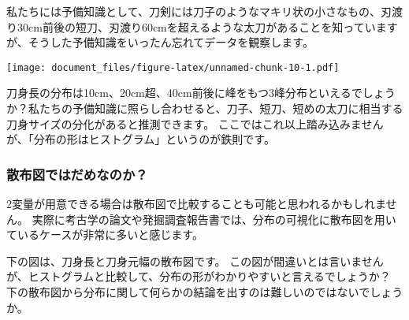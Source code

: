 \documentclass[]{article}
\newenvironment{Shaded}{\begin{snugshade}}{\end{snugshade}}
\newcommand{\DataTypeTok}[1]{\textcolor[rgb]{0.13,0.29,0.53}{#1}}
\newcommand{\KeywordTok}[1]{\textcolor[rgb]{0.13,0.29,0.53}{\textbf{#1}}}
\newcommand{\NormalTok}[1]{#1}
\newcommand{\OperatorTok}[1]{\textcolor[rgb]{0.81,0.36,0.00}{\textbf{#1}}}
\newcommand{\StringTok}[1]{\textcolor[rgb]{0.31,0.60,0.02}{#1}}
\begin{document}
私たちには予備知識として、刀剣には刀子のようなマキリ状の小さなもの、刃渡り30cm前後の短刀、刃渡り60cmを超えるような太刀があることを知っていますが、そうした予備知識をいったん忘れてデータを観察します。

\begin{Shaded}
\end{Shaded}

\texttt{[image: document\_files/figure-latex/unnamed-chunk-10-1.pdf]}

刀身長の分布は10cm、20cm超、40cm前後に峰をもつ3峰分布といえるでしょうか？私たちの予備知識に照らし合わせると、刀子、短刀、短めの太刀に相当する刀身サイズの分化があると推測できます。
ここではこれ以上踏み込みませんが、「分布の形はヒストグラム」というのが鉄則です。

\subsubsection{散布図ではだめなのか？}

2変量が用意できる場合は散布図で比較することも可能と思われるかもしれません。
実際に考古学の論文や発掘調査報告書では、分布の可視化に散布図を用いているケースが非常に多いと感じます。

下の図は、刀身長と刀身元幅の散布図です。
この図が間違いとは言いませんが、ヒストグラムと比較して、分布の形がわかりやすいと言えるでしょうか？
下の散布図から分布に関して何らかの結論を出すのは難しいのではないでしょうか。

\begin{Shaded}
\end{Shaded}
\end{document}
